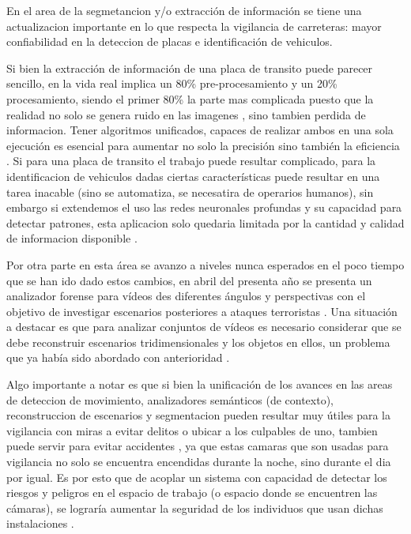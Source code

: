 \documentclass[a4paper]{IEEEtranUNT}
\begin{document}
En el area de la segmetancion y/o extracción de información se tiene una actualizacion importante en lo que respecta la vigilancia de carreteras: mayor confiabilidad en la deteccion de placas e identificación de vehiculos.

Si bien la extracción de información de una placa de transito puede parecer sencillo, en la vida real implica un 80\% pre-procesamiento y un 20\% procesamiento, siendo el primer 80\% la parte mas complicada puesto que la realidad no solo se genera ruido en las imagenes , sino tambien perdida de informacion. Tener algoritmos unificados, capaces de realizar ambos en una sola ejecución es esencial para aumentar no solo la precisión sino también la eficiencia \citep{Quiros2015}. Si para una placa de transito el trabajo puede resultar complicado, para la identificacion de vehiculos dadas ciertas características puede resultar en una tarea inacable (sino se automatiza, se necesatira de operarios humanos), sin embargo si extendemos el uso las redes neuronales profundas y su capacidad para detectar patrones, esta aplicacion solo quedaria limitada por la cantidad y calidad de informacion disponible \citep{qian2019stripebased}.

Por otra parte en esta área se avanzo a niveles nunca esperados en el poco tiempo que se han ido dado estos cambios, en abril del presenta año se presenta un analizador forense para vídeos des diferentes ángulos y perspectivas con el objetivo de investigar escenarios posteriores a ataques terroristas \citep{alex2020multimodal}. Una situación a destacar es que para analizar conjuntos de vídeos es necesario considerar que se debe reconstruir escenarios tridimensionales y los objetos en ellos, un problema que ya había sido abordado con anterioridad \citep{Sumi}.

Algo importante a notar es que si bien la unificación de los avances en las areas de deteccion de movimiento, analizadores semánticos (de contexto), reconstruccion de escenarios y segmentacion pueden resultar muy útiles para la vigilancia con miras a evitar delitos o ubicar a los culpables de uno, tambien puede servir para evitar accidentes \citep{Yoshimoto2004}, ya que estas camaras que son usadas para vigilancia no solo se encuentra encendidas durante la noche, sino durante el dia por igual. Es por esto que de acoplar un sistema con capacidad de detectar los riesgos y peligros en el espacio de trabajo (o espacio donde se encuentren las cámaras), se lograría aumentar la seguridad de los individuos que usan dichas instalaciones \citep{Zubal2016}.
\end{document}
